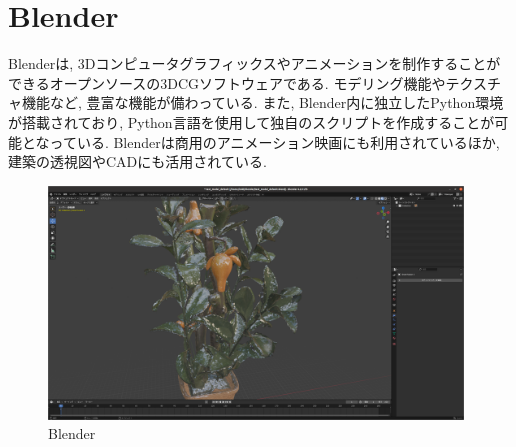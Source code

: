 \section{Blender}
Blenderは, 3Dコンピュータグラフィックスやアニメーションを制作することができるオープンソースの3DCGソフトウェアである.
モデリング機能やテクスチャ機能など, 豊富な機能が備わっている.
また, Blender内に独立したPython環境が搭載されており, Python言語を使用して独自のスクリプトを作成することが可能となっている.
Blenderは商用のアニメーション映画にも利用されているほか, 建築の透視図やCADにも活用されている.

\vspace{5mm}
\begin{figure}[H]
     \centering
     \includegraphics[width=110mm]{images/png/blenderex.png}
     \caption{Blender}
     \label{Fig:blenderex}
   \end{figure}